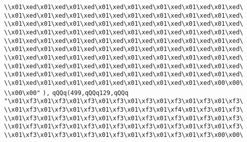 \verb|\\x01\xed\x01\xed\x01\xed\x01\xed\x01\xed\x01\xed\x01\xed\x01\xed\|\newline
\verb|\\x01\xed\x01\xed\x01\xed\x01\xed\x01\xed\x01\xed\x01\xed\x01\xed\|\newline
\verb|\\x01\xed\x01\xed\x01\xed\x01\xed\x01\xed\x01\xed\x01\xed\x01\xed\|\newline
\verb|\\x01\xed\x01\xed\x01\xed\x01\xed\x01\xed\x01\xed\x01\xed\x01\xed\|\newline
\verb|\\x01\xed\x01\xed\x01\xed\x01\xed\x01\xed\x01\xed\x01\xed\x01\xed\|\newline
\verb|\\x01\xed\x01\xed\x01\xed\x01\xed\x01\xed\x01\xed\x01\xed\x01\xed\|\newline
\verb|\\x01\xed\x01\xed\x01\xed\x01\xed\x01\xed\x01\xed\x01\xed\x01\xed\|\newline
\verb|\\x01\xed\x01\xed\x01\xed\x01\xed\x01\xed\x01\xed\x01\xed\x01\xed\|\newline
\verb|\\x01\xed\x01\xed\x01\xed\x01\xed\x01\xed\x01\xed\x01\xed\x01\xed\|\newline
\verb|\\x01\xed\x01\xed\x01\xed\x01\xed\x01\xed\x01\xed\x01\xed\x00\x00\|\newline
\verb|\\x00\x00"|\newline
\verb|),|\newline
\verb|qQQq(499,qQQq129,qQQq|\newline
\verb|"\x01\xf3\x01\xf3\x01\xf3\x01\xf3\x01\xf3\x01\xf3\x01\xf3\x01\xf3\|\newline
\verb|\\x01\xf3\x01\xf3\x01\xf3\x01\xf3\x01\xf3\x01\xf4\x01\xf3\x01\xf3\|\newline
\verb|\\x01\xf3\x01\xf3\x01\xf3\x01\xf3\x01\xf3\x01\xf3\x01\xf3\x01\xf3\|\newline
\verb|\\x01\xf3\x01\xf3\x01\xf3\x01\xf3\x01\xf3\x01\xf3\x01\xf3\x01\xf3\|\newline
\verb|\\x01\xf3\x01\xf3\x01\xf3\x01\xf3\x01\xf3\x01\xf3\x01\xf3\x00\x00\|\newline
